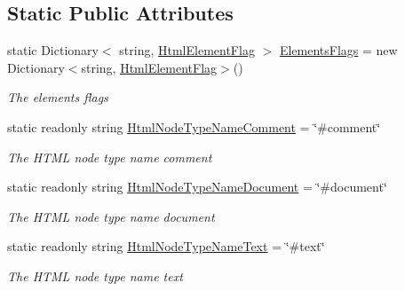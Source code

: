 \subsection*{Static Public Attributes}
\begin{DoxyCompactItemize}
\item 
static Dictionary$<$ string, \hyperlink{namespace_html_agility_pack_a4db40c4f5c900094c5a7fba47320a34a}{Html\+Element\+Flag} $>$ \hyperlink{class_html_agility_pack_1_1_html_node_af13756973e13f0e57e468b2aa4f0d279}{Elements\+Flags} = new Dictionary$<$string, \hyperlink{namespace_html_agility_pack_a4db40c4f5c900094c5a7fba47320a34a}{Html\+Element\+Flag}$>$()
\begin{DoxyCompactList}\small\item\em The elements flags \end{DoxyCompactList}\item 
static readonly string \hyperlink{class_html_agility_pack_1_1_html_node_a4fcdace39efc99e574203a53331c73ca}{Html\+Node\+Type\+Name\+Comment} = \char`\"{}\#comment\char`\"{}
\begin{DoxyCompactList}\small\item\em The H\+T\+ML node type name comment \end{DoxyCompactList}\item 
static readonly string \hyperlink{class_html_agility_pack_1_1_html_node_a57a4fb1dc2f4bdfc627ef0899f65d203}{Html\+Node\+Type\+Name\+Document} = \char`\"{}\#document\char`\"{}
\begin{DoxyCompactList}\small\item\em The H\+T\+ML node type name document \end{DoxyCompactList}\item 
static readonly string \hyperlink{class_html_agility_pack_1_1_html_node_aa3594faf0c6d5483bdaae5428d52a0c9}{Html\+Node\+Type\+Name\+Text} = \char`\"{}\#text\char`\"{}
\begin{DoxyCompactList}\small\item\em The H\+T\+ML node type name text \end{DoxyCompactList}\end{DoxyCompactItemize}
